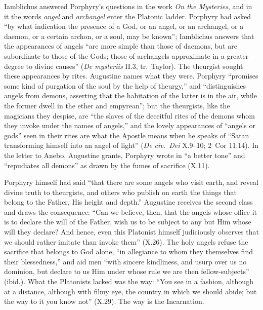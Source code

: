 Iamblichus answered Porphyry's questions in the work \emph{On the
Mysteries}, and in it the words \emph{angel} and
\emph{archangel} enter the Platonic ladder. Porphyry had asked ``by what
indication the presence of a God, or an angel, or an archangel, or a
daemon, or a certain archon, or a soul, may be known''; Iamblichus
answers that the appearances of angels ``are more simple than those
of daemons, but are subordinate to those of the Gods; those of
archangels approximate in a greater degree to divine causes'' (\emph{De
mysteriis} II.3, tr.\ Taylor). The theurgist sought these appearances by
rites. Augustine names what they were. Porphyry ``promises some kind of
purgation of the soul by the help of theurgy,'' and ``distinguishes
angels from demons, asserting that the habitation of the latter is in
the air, while the former dwell in the ether and empyrean''; but the
theurgists, like the magicians they despise, are ``the slaves of the
deceitful rites of the demons whom they invoke under the names of
angels,'' and the lovely appearances of ``angels or gods'' seen in their
rites are what the Apostle means when he speaks of ``Satan transforming
himself into an angel of light'' (\emph{De civ.\ Dei} X.9--10; 2~Cor
11:14). In the letter to Anebo, Augustine grants, Porphyry wrote in ``a
better tone'' and ``repudiates all demons'' as drawn by the fumes of
sacrifice (X.11).

Porphyry himself had said ``that there are some angels who visit earth,
and reveal divine truth to theurgists, and others who publish on earth
the things that belong to the Father, His height and depth.'' Augustine
receives the second class and draws the consequence: ``Can we believe,
then, that the angels whose office it is to declare the will of the
Father, wish us to be subject to any but Him whose will they declare?
And hence, even this Platonist himself judiciously observes that we
should rather imitate than invoke them'' (X.26). The holy angels refuse
the sacrifice that belongs to God alone, ``in allegiance to whom they
themselves find their blessedness,'' and aid men ``with sincere
kindliness, and usurp over us no dominion, but declare to us Him under
whose rule we are then fellow-subjects'' (ibid.). What the Platonists
lacked was the way: ``You see in a fashion, although at a distance,
although with filmy eye, the country in which we should abide; but the
way to it you know not'' (X.29). The way is the Incarnation.

